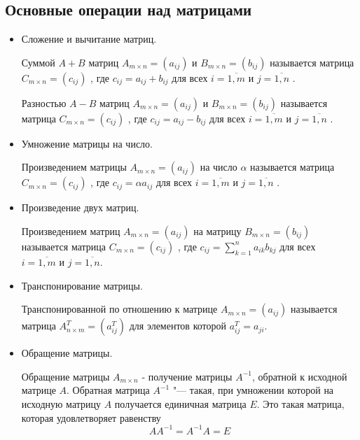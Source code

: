 \documentclass[bachelor, och, labwork]{shiza}
\begin{document}
    \subsection{Основные операции над матрицами}

    \begin{itemize}
            \item Сложение и вычитание матриц.
        
            Суммой $A + B$ матриц $A_{m \times n} = (a_{ij}) \text{ и }B_{m \times n} = (b_{ij})$ называется матрица 
            $C_{m \times n} = (c_{ij})$ , где $c_{ij} = a_{ij} + b_{ij}$ для всех $i = \overline{1, m} \text{ и } j = \overline{1, n}$ .

            Разностью $A - B$ матриц $A_{m \times n} = (a_{ij}) \text{ и }B_{m \times n} = (b_{ij})$ называется матрица 
            $C_{m \times n} = (c_{ij})$ , где $c_{ij} = a_{ij} - b_{ij}$ для всех $i = \overline{1, m} \text{ и } j = \overline{1, n}$ .

        \item Умножение матрицы на число.
        
            Произведением матрицы $A_{m \times n} = (a_{ij}) \text{ на число } \alpha$ называется матрица 
            $C_{m \times n} = (c_{ij})$ , где $c_{ij} = \alpha a_{ij}$ для всех $i = \overline{1, m} \text{ и } j = \overline{1, n}$ .

        \item Произведение двух матриц.
        
            Произведением матриц $A_{m \times n} = (a_{ij}) \text{ на матрицу }B_{m \times n} = (b_{ij})$ называется матрица 
            $C_{m \times n} = (c_{ij})$ , где $c_{ij} = \sum\limits_{k=1}^n a_{ik}b_{kj}$ для всех $i = \overline{1, m} \text{ и } j = \overline{1, n}$.
        
        \item Транспонирование матрицы.
        
            Транспонированной по отношению к матрице $A_{m \times n} = (a_{ij})$ называется матрица $A^T_{n \times m} = (a^T_{ij})$
            для элементов которой $a^T_{ij} = a_{ji}$.
        
        \item Обращение матрицы.

            Обращение матрицы $A_{m \times n}$ - получение матрицы $A^{-1}$, обратной к исходной матрице $A$. Обратная
            матрица $A^{-1}$ "--- такая, при умножении которой на исходную матрицу $A$ получается единичная матрица $E$.
            Это такая матрица, которая удовлетворяет равенству \[AA^{-1} = A^{-1}A = E\] 

    \end{itemize}
\end{document}
